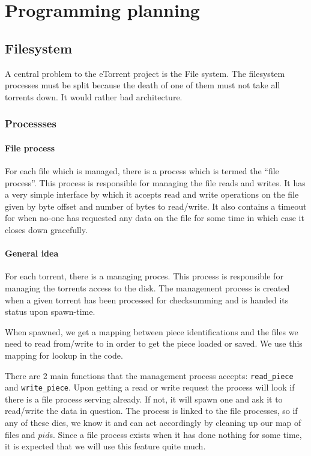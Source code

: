 \documentclass[a4paper]{memoir}
\begin{document}
\chapter{Programming planning}
\section{Filesystem}
A central problem to the eTorrent project is the File system. The
filesystem processes must be split because the death of one of them
must not take all torrents down. It would rather bad architecture.

\subsection{Processses}
\subsubsection{File process}
For each file which is managed, there is a process which is termed the
``file process''. This process is responsible for managing the file
reads and writes. It has a very simple interface by which it accepts
read and write operations on the file given by byte offset and number
of bytes to read/write. It also contains a timeout for when no-one has
requested any data on the file for some time in which case it closes
down gracefully.

\subsubsection{General idea}
For each torrent, there is a managing proces. This process is
responsible for managing the torrents access to the disk. The
management process is created when a given torrent has been processed
for checksumming and is handed its status upon spawn-time.

When spawned, we get a mapping between piece identifications and the
files we need to read from/write to in order to get the piece loaded
or saved. We use this mapping for lookup in the code.

There are 2 main functions that the management process accepts:
\texttt{read\_piece} and \texttt{write\_piece}. Upon getting a read or
write request the process will look if there is a file process serving
already. If not, it will spawn one and ask it to read/write the data
in question. The process is linked to the file processes, so if any of
these dies, we know it and can act accordingly by cleaning up our map
of files and $pid$s. Since a file process exists when it has done
nothing for some time, it is expected that we will use this feature
quite much.
\end{document}
